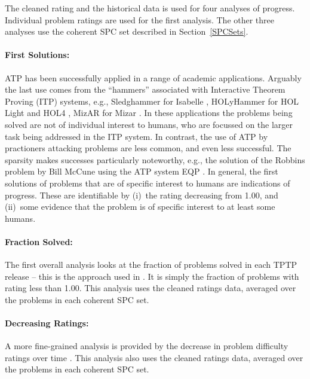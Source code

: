 \documentclass[runningheads]{llncs}
\begin{document}
The cleaned rating and the historical data is used for four analyses of progress.
Individual problem ratings are used for the first analysis.
The other three analyses use the coherent SPC set described in Section~\ref{SPCSets}.

\paragraph{First Solutions:}
ATP has been successfully applied in a range of academic applications.
Arguably the last use comes from the ``hammers'' \cite{BK+16} associated with Interactive 
Theorem Proving (ITP) systems, e.g., Sledghammer \cite{PB10} for Isabelle \cite{NPW02}, 
HOLyHammer \cite{KU14} for HOL Light \cite{Har09} and HOL4 \cite{SN08}, 
MizAR \cite{KU15-M40} for Mizar \cite{GKN10}.
In these applications the problems being solved are not of individual interest to humans,
who are focussed on the larger task being addressed in the ITP system.
In contrast, the use of ATP by practioners attacking problems are less common, and even
less successful.
The sparsity makes successes particularly noteworthy, e.g., the solution of the Robbins
problem by Bill McCune using the ATP system EQP \cite{McC97}.
In general, the first solutions of problems that are of specific interest to humans are
indications of progress.
These are identifiable by (i)~the rating decreasing from 1.00, and (ii)~some evidence that the 
problem is of specific interest to at least some humans.

\paragraph{Fraction Solved:}
The first overall analysis looks at the fraction of problems solved in each TPTP release --
this is the approach used in \cite{SSP21}.
It is simply the fraction of problems with rating less than 1.00.
This analysis uses the cleaned ratings data, averaged over the problems in each coherent SPC set.

\paragraph{Decreasing Ratings:}
A more fine-grained analysis is provided by the decrease in problem difficulty ratings over
time \cite{SFS01}.
This analysis also uses the cleaned ratings data, averaged over the problems in each coherent 
SPC set.
\end{document}
